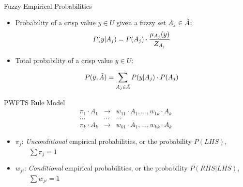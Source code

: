 \documentclass{beamer}
\begin{document}
\begin{frame}{Fuzzy Empirical Probabilities}
\begin{itemize}
    \item Probability of a crisp value $y \in U$ given a fuzzy set $A_j \in \tilde{A}$:
$$
P(y | A_j) = P(A_j) \cdot \frac{\mu_{A_j}(y)}{Z_{A_j}}
$$

    \item Total probability of a crisp value $y \in U$:
    
$$
P(y,\tilde{A}) = \sum_{A_j \in \tilde{A}} P(y | A_j)\cdot P(A_j)
$$

\end{itemize}
\end{frame}



\begin{frame}{PWFTS Rule Model}
\linespread{2}
$$
\begin{array}{rcl}
\pi_1 \cdot A_1 & \rightarrow &  w_{11} \cdot A_1, ..., w_{1k} \cdot A_k \\
\ldots & \ldots & \ldots \\
\pi_k \cdot A_k & \rightarrow &  w_{k1} \cdot A_1, ..., w_{kk} \cdot A_k
\end{array}
$$
\begin{itemize}
    \item $\pi_j$: \textit{Unconditional} empirical probabilities, or the probability $P(LHS)$, $\qquad\sum \pi_j = 1$
    \item $w_{ji}$: \textit{Conditional} empirical probabilities, or the probability $P(RHS|LHS)$, $\qquad\sum w_{ji} = 1$
\end{itemize}
\end{frame}

\end{document}
